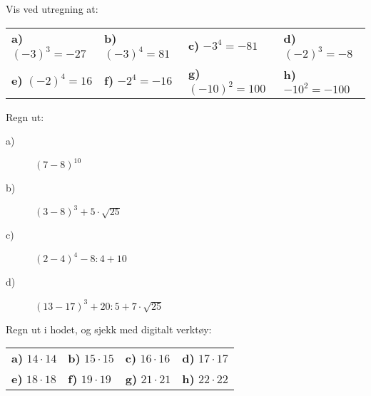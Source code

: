 \documentclass[a4, 11pt, twoside]{article}
\theoremstyle{definition}
\begin{document}
\begin{Exercise}
Vis ved utregning at: \newline
\begin{tabular}{l l l l}
\textbf{a)} $(-3)^3 = -27$ &
\textbf{b)} $(-3)^4 = 81$ &
\textbf{c)} $-3^4 = -81$ &
\textbf{d)} $(-2)^3 = -8$ \\
\textbf{e)} $(-2)^4 = 16$ &
\textbf{f)} $-2^4 = -16$ &
\textbf{g)} $(-10)^2 = 100$ &
\textbf{h)} $-10^2 = -100$
\end{tabular}
\end{Exercise}

\begin{Exercise}
Regn ut:
\begin{description}
\item[a)] $(7 - 8)^{10}$
\item[b)] $(3 - 8)^3 + 5\cdot\sqrt{25}$
\item[c)] $(2 - 4)^4 - 8:4 + 10$
\item[d)] $(13 - 17)^3 + 20:5 + 7\cdot\sqrt{25}$
\end{description}
\end{Exercise}

\begin{Exercise}
Regn ut i hodet, og sjekk med digitalt verktøy: \newline
\begin{tabular}{l l l l}
\textbf{a)} $14\cdot 14$ &
\textbf{b)} $15\cdot 15$ &
\textbf{c)} $16\cdot 16$ &
\textbf{d)} $17\cdot 17$ \\
\textbf{e)} $18\cdot 18$ &
\textbf{f)} $19\cdot 19$ &
\textbf{g)} $21\cdot 21$ &
\textbf{h)} $22\cdot 22$ &
\end{tabular}
\end{Exercise}
\end{document}
